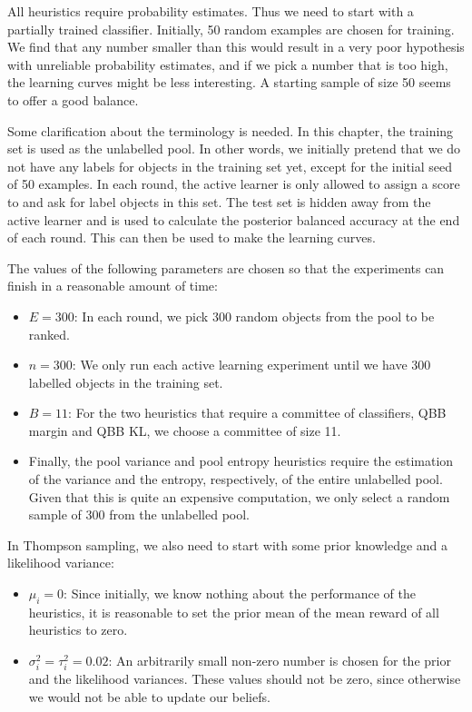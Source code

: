 All heuristics require probability estimates. Thus we need to start with a partially trained
classifier. Initially, 50 random examples are chosen for training. We find that any number smaller
than this would result in a very poor hypothesis with unreliable probability estimates, and if we
pick a number that is too high, the learning curves might be less interesting. A starting sample of
size 50 seems to offer a good balance.

Some clarification about the terminology is needed. In this chapter, the training set is used as
the unlabelled pool. In other words, we initially pretend that we do not have any labels for
objects in the training set yet, except for the initial seed of 50 examples. In each round, the
active learner is only allowed to assign a score to and ask for label objects in this set. The test set is
hidden away from the active learner and is used to calculate the posterior balanced accuracy at the
end of each round. This can then be used to make the learning curves.

The values of the following parameters are chosen so that the experiments can finish in a reasonable
amount of time:
\begin{itemize}
    \item $E = 300$: In each round, we pick 300 random objects from the pool to be ranked.
    
    \item $n = 300$: We only run each active learning experiment until we have 300 labelled
    objects in the training set.
    
    \item $B = 11$: For the two heuristics that require a committee of classifiers, QBB margin and
    QBB KL, we choose a committee of size 11.
    
    \item Finally, the pool variance and pool entropy heuristics require the estimation of the
    variance and the entropy, respectively, of the entire unlabelled pool. Given that this is quite
    an expensive computation, we only select a random sample of 300 from the unlabelled pool.
\end{itemize}
In Thompson sampling, we also need to start with some prior knowledge and a likelihood variance:
\begin{itemize}
    \item $\mu_i = 0$: Since initially, we know nothing about the performance of the heuristics, it
    is reasonable to set the prior mean of the mean reward of all heuristics to zero.
    
    \item $\sigma^2_i = \tau^2_i = 0.02$: An arbitrarily small non-zero number is chosen for the prior and
    the likelihood variances. These values should not be zero, since otherwise we would not be able
    to update our beliefs.
\end{itemize}


